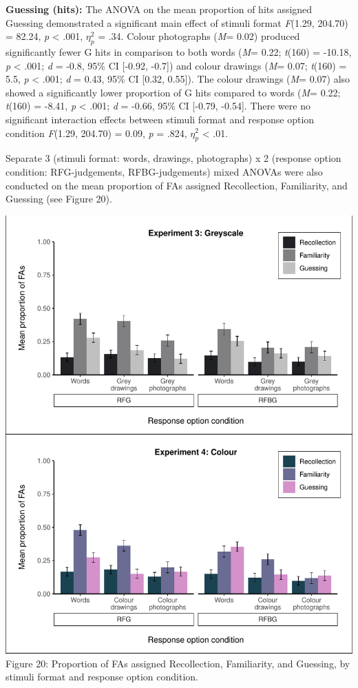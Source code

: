\documentclass[
  11pt,
]{article}
\begin{document}
\textbf{Guessing (hits):} The ANOVA on the mean proportion of hits
assigned Guessing demonstrated a significant main effect of stimuli
format \emph{F}(1.29, 204.70) = 82.24, \emph{p} \textless{} .001,
\(\eta^2_p\) = .34. Colour photographs (\emph{M}= 0.02) produced
significantly fewer G hits in comparison to both words (\emph{M}= 0.22;
\emph{t}(160) = -10.18, \emph{p} \textless{} .001; \emph{d} = -0.8, 95\%
CI {[}-0.92, -0.7{]}) and colour drawings (\emph{M}= 0.07; \emph{t}(160)
= 5.5, \emph{p} \textless{} .001; \emph{d} = 0.43, 95\% CI {[}0.32,
0.55{]}). The colour drawings (\emph{M}= 0.07) also showed a
significantly lower proportion of G hits compared to words (\emph{M}=
0.22; \emph{t}(160) = -8.41, \emph{p} \textless{} .001; \emph{d} =
-0.66, 95\% CI {[}-0.79, -0.54{]}. There were no significant interaction
effects between stimuli format and response option condition
\emph{F}(1.29, 204.70) = 0.09, \emph{p} = .824, \(\eta^2_p\) \textless{}
.01.

Separate 3 (stimuli format: words, drawings, photographs) x 2 (response
option condition: RFG-judgements, RFBG-judgements) mixed ANOVAs were
also conducted on the mean proportion of FAs assigned Recollection,
Familiarity, and Guessing (see Figure 20).

\includegraphics{R--Thesis_files/figure-latex/unnamed-chunk-68-1.pdf}
Figure 20: Proportion of FAs assigned Recollection, Familiarity, and
Guessing, by stimuli format and response option condition.
\end{document}
